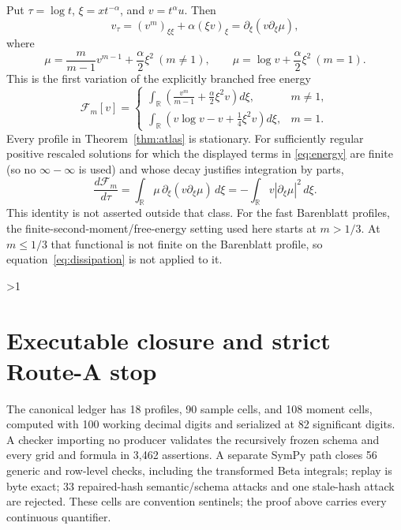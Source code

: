 \documentclass[9pt]{extarticle}
\newcommand{\R}{\mathbb R}
\begin{document}
Put $\tau=\log t$, $\xi=xt^{-\alpha}$, and $v=t^\alpha u$.  Then
\begin{equation}\label{eq:rescaled}
 v_\tau=(v^m)_{\xi\xi}+\alpha(\xi v)_\xi
 =\partial_\xi(v\partial_\xi\mu),
\end{equation}
where
\[
 \mu=\frac{m}{m-1}v^{m-1}+\frac\alpha2\xi^2\ (m\ne1),
 \qquad \mu=\log v+\frac\alpha2\xi^2\ (m=1).
\]
This is the first variation of the explicitly branched free energy
\begin{equation}\label{eq:energy}
 \mathcal F_m[v]=
 \begin{cases}
 \displaystyle\int_\R\left(\frac{v^m}{m-1}
       +\frac\alpha2\xi^2v\right)d\xi,&m\ne1,\\[5pt]
 \displaystyle\int_\R\left(v\log v-v
       +\frac14\xi^2v\right)d\xi,&m=1.
 \end{cases}
\end{equation}
Every profile in Theorem~\ref{thm:atlas} is stationary.  For sufficiently
regular positive rescaled solutions for which the displayed terms in
\eqref{eq:energy} are finite (so no $\infty-\infty$ is used) and whose decay
justifies integration by parts,
\begin{equation}\label{eq:dissipation}
 \frac{d\mathcal F_m}{d\tau}
 =\int_\R\mu\,\partial_\xi(v\partial_\xi\mu)\,d\xi
 =-\int_\R v|\partial_\xi\mu|^2\,d\xi.
\end{equation}
This identity is not asserted outside that class.  For the fast Barenblatt
profiles, the finite-second-moment/free-energy setting used here starts at
$m>1/3$.  At $m\le1/3$ that functional is not finite on the Barenblatt
profile, so equation~\eqref{eq:dissipation} is not applied to it.
\fi

\ifnum\CRevisionRound>1
\section{Executable closure and strict Route-A stop}
The canonical ledger has 18 profiles, 90 sample cells, and 108 moment cells,
computed with 100 working decimal digits and serialized at 82 significant
digits.  A checker importing no producer validates the recursively frozen
schema and every grid and formula in 3,462 assertions.  A separate SymPy path
closes 56 generic and row-level checks, including the transformed Beta
integrals; replay is byte exact; 33 repaired-hash semantic/schema attacks and
one stale-hash attack are rejected.  These cells are convention sentinels;
the proof above carries every continuous quantifier.
\end{document}
